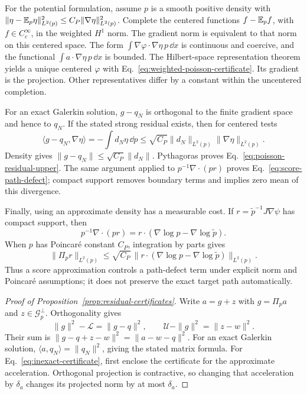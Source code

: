 For the potential formulation, assume $p$ is a smooth positive density
with $\|\eta-\mathbb E_p\eta\|_{L^2(p)}^2\le
C_P\|\nabla\eta\|_{L^2(p)}^2$.  Complete the centered functions $f-\mathbb E_pf$, with $f\in C_c^\infty$,
in the weighted $H^1$ norm.  The gradient norm is
equivalent to that norm on this centered space.  The form
$\int\nabla\varphi\cdot\nabla\eta\,p\,\dd x$ is continuous and
coercive, and the functional $\int a\cdot\nabla\eta\,p\,\dd x$ is
bounded.  The Hilbert-space representation theorem yields a unique
centered $\varphi$ with Eq.~\eqref{eq:weighted-poisson-certificate}.
Its gradient is the projection.  Other representatives differ by a
constant within the uncentered completion.

For an exact Galerkin solution, $g-q_N$ is orthogonal to the finite
gradient space and hence to $q_N$.  If the stated strong residual exists,
then for centered tests
\[
 \langle g-q_N,\nabla\eta\rangle
   =-\int d_N\eta\,\dd p
   \le\sqrt{C_P}\|d_N\|_{L^2(p)}\|\nabla\eta\|_{L^2(p)}.
\]
Density gives $\|g-q_N\|\le\sqrt{C_P}\|d_N\|$.  Pythagoras proves
Eq.~\eqref{eq:poisson-residual-upper}.  The same argument applied to
$p^{-1}\nabla\cdot(pr)$ proves Eq.~\eqref{eq:score-path-defect}; compact
support removes boundary terms and implies zero mean of this divergence.

Finally, using an approximate density has a measurable cost.  If
$r=\widetilde p^{-1}J\nabla\psi$ has compact support, then
\[
 p^{-1}\nabla\cdot(pr)
 =r\cdot(\nabla\log p-\nabla\log\widetilde p).
\]
When $p$ has Poincar\'e constant $C_P$, integration by parts gives
\begin{equation}
 \|\Pi_pr\|_{L^2(p)}
 \le\sqrt{C_P}\,
 \|r\cdot(\nabla\log p-\nabla\log\widetilde p)\|_{L^2(p)}.
 \label{eq:score-path-defect}
\end{equation}
Thus a score approximation controls a path-defect term under explicit
norm and Poincar\'e assumptions; it does not preserve the exact target
path automatically.

\begin{proof}[Proof of Proposition~\ref{prop:residual-certificates}]
Write $a=g+z$ with $g=\Pi_pa$ and $z\in\mathcal G_p^\perp$.  Orthogonality
gives
\[
 \|g\|^2-\mathcal L=\|g-q\|^2,\qquad
 \mathcal U-\|g\|^2=\|z-w\|^2.
\]
Their sum is $\|g-q+z-w\|^2=\|a-w-q\|^2$.  For an exact Galerkin
solution, $\langle a,q_N\rangle=\|q_N\|^2$, giving the stated matrix
formula.  For Eq.~\eqref{eq:inexact-certificate}, first enclose the
certificate for the approximate acceleration.  Orthogonal projection is
contractive, so changing that acceleration by $\delta_a$ changes its
projected norm by at most $\delta_a$.
\end{proof}

